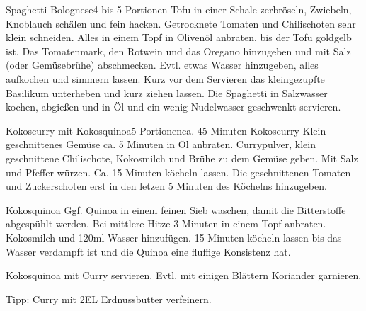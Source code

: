 \documentclass[a4paper,10pt]{article}
\begin{document}
    \newpage
       
    \begin{recipe}{Spaghetti Bolognese}{4 bis 5 Portionen}{}
	Tofu in einer Schale zerbröseln, Zwiebeln, Knoblauch schälen und fein hacken.
        Getrocknete Tomaten und Chilischoten sehr klein schneiden. Alles in einem Topf in Olivenöl
        anbraten, bis der Tofu goldgelb ist.
	Das Tomatenmark, den Rotwein und das Oregano hinzugeben und mit Salz (oder Gemüsebrühe) abschmecken.
	Evtl. etwas Wasser hinzugeben, alles aufkochen und simmern lassen.
	Kurz vor dem Servieren das kleingezupfte Basilikum unterheben und kurz ziehen lassen.
        Die Spaghetti in Salzwasser kochen, abgießen und in Öl und ein wenig Nudelwasser geschwenkt servieren.
    \end{recipe}
    
    \newpage
    
    \begin{recipe}{Kokoscurry mit Kokosquinoa}{5 Portionen}{ca. 45 Minuten}
        \freeform Kokoscurry
        Klein geschnittenes Gemüse ca. 5 Minuten in \"Ol anbraten.
        Currypulver, klein geschnittene Chilischote, Kokosmilch und Brühe zu 
        dem Gemüse geben. Mit Salz und Pfeffer würzen. Ca. 15 Minuten k\"ocheln 
        lassen.
        Die geschnittenen Tomaten und Zuckerschoten erst in den letzen 5 
        Minuten des K\"ochelns hinzugeben.
    
        \freeform Kokosquinoa
        Ggf. Quinoa in einem feinen Sieb waschen, damit die Bitterstoffe 
        abgespühlt werden. Bei mittlere Hitze 3 Minuten in einem Topf anbraten. 
        Kokosmilch und 120ml Wasser hinzufügen. 15 Minuten k\"ocheln lassen bis 
        das Wasser verdampft ist und die Quinoa eine fluffige Konsistenz hat.
        
        \newstep Kokosquinoa mit Curry servieren. Evtl. mit einigen Blättern 
        Koriander garnieren.
        
        \freeform Tipp: Curry mit 2EL Erdnussbutter verfeinern.

    \end{recipe}
    
\end{document}
